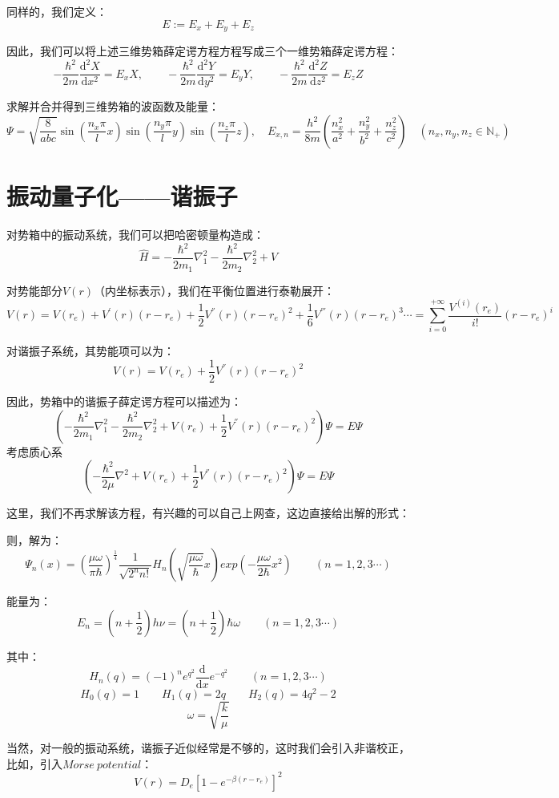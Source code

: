同样的，我们定义：
\[E:=E_x+E_y+E_z\]

因此，我们可以将上述三维势箱薛定谔方程方程写成三个一维势箱薛定谔方程：
\[-\frac{\hbar^2}{2m}\frac{\mathrm{d}^2X}{\mathrm{d}x^2}=E_xX, \qquad -\frac{\hbar^2}{2m}\frac{\mathrm{d}^2Y}{\mathrm{d}y^2}=E_yY, \qquad -\frac{\hbar^2}{2m}\frac{\mathrm{d}^2Z}{\mathrm{d}z^2}=E_zZ\]

求解并合并得到三维势箱的波函数及能量：
\[\varPsi=\sqrt{\frac{8}{abc}}\sin\left (\frac{n_x \pi}{l}x \right )\sin\left (\frac{n_y \pi}{l}y \right )\sin\left (\frac{n_z \pi}{l}z \right ), \quad E_{x,n}=\frac{h^2}{8m} \left (\frac{n_x^2}{a^2}+\frac{n_y^2}{b^2}+\frac{n_z^2}{c^2} \right ) \quad (n_x,n_y,n_z \in \mathbb{N}_+)\]

\section{振动量子化——谐振子}
对势箱中的振动系统，我们可以把哈密顿量构造成：
\[\hat{H}=-\frac{\hbar^2}{2m_1}\nabla^2_1-\frac{\hbar^2}{2m_2}\nabla^2_2+V\]

对势能部分$V(r)$（内坐标表示），我们在平衡位置进行泰勒展开：
\[V(r)=V(r_e)+V^{'}(r)(r-r_e)+\frac{1}{2}V^{''}(r)(r-r_e)^2+\frac{1}{6}V^{'''}(r)(r-r_e)^3 \cdots=\sum_{i=0}^{+\infty}\frac{V^{(i)}(r_e)}{i!}(r-r_e)^i\]

对谐振子系统，其势能项可以为：
\[V(r)=V(r_e)+\frac{1}{2}V^{''}(r)(r-r_e)^2\]

因此，势箱中的谐振子薛定谔方程可以描述为：
\[\left (-\frac{\hbar^2}{2m_1}\nabla^2_1-\frac{\hbar^2}{2m_2}\nabla^2_2+V(r_e)+\frac{1}{2}V^{''}(r)(r-r_e)^2 \right )\varPsi=E\varPsi\]
考虑质心系
\[\left (-\frac{\hbar^2}{2\mu}\nabla^2+V(r_e)+\frac{1}{2}V^{''}(r)(r-r_e)^2 \right )\varPsi=E\varPsi\]

这里，我们不再求解该方程，有兴趣的可以自己上网查，这边直接给出解的形式：

则，解为：
\[\varPsi_n(x)=\left(\frac{\mu\omega}{\pi\hbar}\right)^{\frac{1}{4}}\frac{1}{\sqrt{2^nn!}}H_n(\sqrt{\frac{\mu\omega}{\hbar}}x)exp\left(-\frac{\mu\omega}{2\hbar}x^2\right) \qquad (n=1,2,3 \cdots)\]

能量为：
\[E_n=\left(n+\frac{1}{2}\right)h\nu=\left(n+\frac{1}{2}\right)\hbar\omega \qquad (n=1,2,3\cdots)\]

其中：
\[H_n(q)=(-1)^ne^{q^2}\frac{\mathrm{d}}{\mathrm{d}x}e^{-q^2} \qquad (n=1,2,3\cdots)\]
\[H_0(q)=1 \qquad H_1(q)=2q \qquad H_2(q)=4q^2-2\]
\[\omega=\sqrt{\frac{k}{\mu}}\]

当然，对一般的振动系统，谐振子近似经常是不够的，这时我们会引入非谐校正，比如，引入$Morse \ potential$：
\[V(r)=D_e\left[1-e^{-\beta(r-r_e)}\right]^2\]

